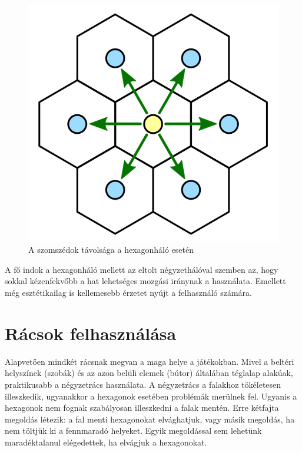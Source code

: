\begin{figure}[h]
\centering
\includegraphics[scale=0.2]{kepek/img23.png}
\caption{A szomszédok távolsága a hexagonháló esetén}
\label{fig:img23}
\end{figure}

\noindent A fő indok a hexagonháló mellett az eltolt négyzethálóval szemben az, hogy sokkal kézenfekvőbb a hat lehetséges mozgási iránynak a használata. Emellett még esztétikailag is kellemesebb érzetet nyújt a felhasználó számára.

\section{Rácsok felhasználása}

Alapvetően mindkét rácsnak megvan a maga helye a játékokban. 
\newline
\newline Mivel a beltéri helyszínek (szobák) és az azon belüli elemek (bútor) általában téglalap alakúak, praktikusabb a négyzetrács használata. A négyzetrács a falakhoz tökéletesen illeszkedik, ugyanakkor a hexagonok esetében problémák merülnek fel. Ugyanis a hexagonok nem fognak szabályosan illeszkedni a falak mentén. Erre kétfajta megoldás létezik: a fal menti hexagonokat elvághatjuk, vagy másik megoldás, ha nem töltjük ki a fennmaradó helyeket. Egyik megoldással sem lehetünk maradéktalanul elégedettek, ha elvágjuk a hexagonokat. 
\newline

